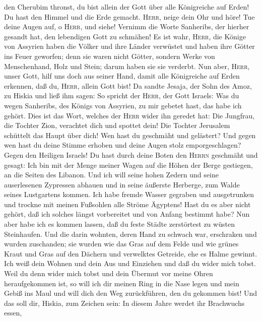 den Cherubim thronst, du bist allein der Gott über alle Königreiche auf
Erden! Du hast den Himmel und die Erde gemacht. 
\textsc{Herr}, neige dein Ohr und höre! Tue deine Augen auf, o
\textsc{Herr}, und siehe! Vernimm die Worte Sanheribs, der hierher
gesandt hat, den lebendigen Gott zu schmähen!  Es ist
wahr, \textsc{Herr}, die Könige von Assyrien haben die Völker und ihre
Länder verwüstet  und haben ihre Götter ins Feuer
geworfen; denn sie waren nicht Götter, sondern Werke von Menschenhand,
Holz und Stein; darum haben sie sie verderbt.  Nun aber,
\textsc{Herr}, unser Gott, hilf uns doch aus seiner Hand, damit alle
Königreiche auf Erden erkennen, daß du, \textsc{Herr}, allein Gott bist!
 Da sandte Jesaja, der Sohn des Amoz, zu Hiskia und ließ
ihm sagen: So spricht der \textsc{Herr}, der Gott Israels: Was du wegen
Sanheribs, des Königs von Assyrien, zu mir gebetet hast, das habe ich
gehört.  Dies ist das Wort, welches der \textsc{Herr}
wider ihn geredet hat: Die Jungfrau, die Tochter Zion, verachtet dich
und spottet dein! Die Tochter Jerusalem schüttelt das Haupt über dich!
 Wen hast du geschmäht und gelästert? Und gegen wen hast
du deine Stimme erhoben und deine Augen stolz emporgeschlagen? Gegen den
Heiligen Israels!  Du hast durch deine Boten den
\textsc{Herrn} geschmäht und gesagt: Ich bin mit der Menge meiner Wagen
auf die Höhen der Berge gestiegen, an die Seiten des Libanon. Und ich
will seine hohen Zedern und seine auserlesenen Zypressen abhauen und in
seine äußerste Herberge, zum Walde seines Lustgartens kommen.
 Ich habe fremde Wasser gegraben und ausgetrunken und
trockne mit meinen Fußsohlen alle Ströme Ägyptens!  Hast
du es aber nicht gehört, daß ich solches längst vorbereitet und von
Anfang bestimmt habe? Nun aber habe ich es kommen lassen, daß du feste
Städte zerstörtest zu wüsten Steinhaufen.  Und die darin
wohnten, deren Hand zu schwach war, erschraken und wurden zuschanden;
sie wurden wie das Gras auf dem Felde und wie grünes Kraut und Gras auf
den Dächern und verwelktes Getreide, ehe es Halme gewinnt.
 Ich weiß dein Wohnen und dein Aus und Einziehen und daß
du wider mich tobst.  Weil du denn wider mich tobst und
dein Übermut vor meine Ohren heraufgekommen ist, so will ich dir meinen
Ring in die Nase legen und mein Gebiß ins Maul und will dich den Weg
zurückführen, den du gekommen bist!  Und das soll dir,
Hiskia, zum Zeichen sein: In diesem Jahre werdet ihr Brachwuchs essen,
